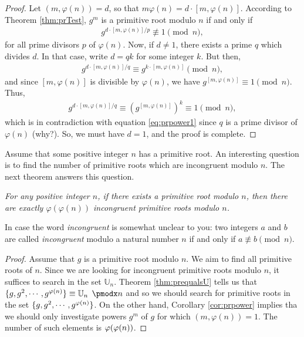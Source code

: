 \documentclass{subfile}
\begin{document}
	\begin{proof}
		Let $(m,\varphi(n))=d$, so that $m\varphi(n)=d\cdot [m,\varphi(n)]$. According to Theorem \ref{thm:prTest}, $g^m$ is a primitive root modulo $n$ if and only if
			\begin{align}\label{eq:prpower1}
			g^{{d\cdot [m,\varphi(n)]}/{p}}\not\equiv1\pmod n,
			\end{align}
		for all prime divisors $p$ of $\varphi(n)$. Now, if $d \neq 1$, there exists a prime $q$ which divides $d$. In that case, write $d=qk$ for some integer $k$. But then,
			\begin{align*}
				g^{{d\cdot [m,\varphi(n)]}/{q}} \equiv g^{k \cdot [m,\varphi(n)]}\pmod n,
			\end{align*}
		and since $[m,\varphi(n)]$ is divisible by $\varphi(n)$, we have $g^{ [m,\varphi(n)]} \equiv 1\pmod n$. Thus,
			\begin{align*}
			g^{{d\cdot [m,\varphi(n)]}/{q}} \equiv \left(g^{[m,\varphi(n)]}\right)^k \equiv 1\pmod n,
			\end{align*}
		which is in contradiction with equation \eqref{eq:prpower1} since $q$ is a prime divisor of $\varphi(n)$ (why?). So, we must have $d=1$, and the proof is complete.
	\end{proof}
	
Assume that some positive integer $n$ has a primitive root. An interesting question is to find the number of primitive roots which are incongruent modulo $n$. The next theorem answers this question.

	\begin{theorem}\slshape\label{thm:npr}
		For any positive integer $n$, if there exists a primitive root modulo $n$, then there are exactly $\varphi(\varphi(n))$ incongruent primitive roots modulo $n$.
	\end{theorem}

	\begin{note}
		In case the word \textit{incongruent} is somewhat unclear to you: two integers $a$ and $b$ are called \textit{incongruent} modulo a natural number $n$ if and only if $a \not \equiv b \pmod n$.
	\end{note}
	
	\begin{proof}
		Assume that $g$ is a primitive root modulo $n$. We aim to find all primitive roots of $n$. Since we are looking for incongruent primitive roots modulo $n$, it suffices to search in the set $\mathbb U_n$. Theorem \ref{thm:prequalsU} tells us that $\{g,g^2,\cdots,g^{\t(n)}\} \equiv \mathbb U_n \pmod n$ and so we should search for primitive roots in the set $\{g,g^2,\cdots,g^{\varphi(n)}\}$. On the other hand, Corollary \ref{cor:prpower} implies tha we should only investigate powers $g^m$ of $g$ for which $(m, \varphi(n))=1$. The number of such elements is $\varphi(\varphi(n))$.
	\end{proof}
	
\end{document}
